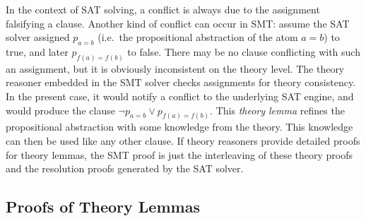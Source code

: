 \documentclass{llncs}
\begin{document}
In the context of SAT solving, a conflict is always due to the assignment
falsifying a clause.  Another kind of conflict can occur in SMT: assume the SAT
solver assigned $p_{a=b}$ (i.e.\ the propositional abstraction of the atom
$a=b$) to true, and later $p_{f(a) = f(b)}$ to false.  There may be no clause
conflicting with such an assignment, but it is obviously inconsistent on the
theory level.  The theory reasoner embedded in the SMT solver checks assignments
for theory consistency.  In the present case, it would notify a conflict to the
underlying SAT engine, and would produce the clause $\neg p_{a=b} \vee p_{f(a) =
  f(b)}$.  This \emph{theory lemma} refines the propositional abstraction with some
knowledge from the theory.  This knowledge can then be used like any other
clause.  If theory reasoners provide detailed proofs for theory lemmas, the SMT
proof is just the interleaving of these theory proofs and the resolution proofs
generated by the SAT solver.

\subsection{Proofs of Theory Lemmas}
\end{document}
